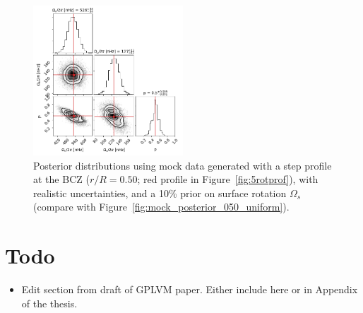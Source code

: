 \begin{figure}
\centering
    \includegraphics[width=0.5\textwidth]{Figures/subgiant_chapter_figures/20.5_corner.png}
    \caption{Posterior distributions using mock data generated with a step profile at the BCZ ($r/R = 0.50$; red profile in Figure~\ref{fig:5rotprof}), with realistic uncertainties, and a 10\% prior on surface rotation $\Omega_s$ (compare with Figure~\ref{fig:mock_posterior_050_uniform}).}
    \label{fig:mock_posterior_050_reject}
\end{figure}
\bsp	%
\label{lastpage}


\section{Todo}
\begin{itemize}
    \item Edit section from draft of GPLVM paper. Either include here or in Appendix of the thesis.
\end{itemize}